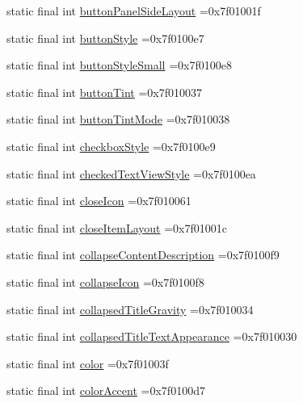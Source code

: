 \begin{DoxyCompactItemize}
\item 
static final int \hyperlink{classcheck_1_1test_1_1_r_1_1attr_a32cad5c610a0ee38f68d1a530b5e5714}{button\+Panel\+Side\+Layout} =0x7f01001f
\item 
static final int \hyperlink{classcheck_1_1test_1_1_r_1_1attr_aeed7bf89db114a56c67e851d7bc203e4}{button\+Style} =0x7f0100e7
\item 
static final int \hyperlink{classcheck_1_1test_1_1_r_1_1attr_ab3ed13cf9d84ee968fa956ca93671a59}{button\+Style\+Small} =0x7f0100e8
\item 
static final int \hyperlink{classcheck_1_1test_1_1_r_1_1attr_ae0edaceba06f9362a37080dd1f7d7822}{button\+Tint} =0x7f010037
\item 
static final int \hyperlink{classcheck_1_1test_1_1_r_1_1attr_ac70c44b347889c97d7002237d7a591d3}{button\+Tint\+Mode} =0x7f010038
\item 
static final int \hyperlink{classcheck_1_1test_1_1_r_1_1attr_ac810a4b97f13c32171e9d45d5921e8a6}{checkbox\+Style} =0x7f0100e9
\item 
static final int \hyperlink{classcheck_1_1test_1_1_r_1_1attr_a7a88a225f47722cfdec2c251480bbaef}{checked\+Text\+View\+Style} =0x7f0100ea
\item 
static final int \hyperlink{classcheck_1_1test_1_1_r_1_1attr_a097e97b7282f3297ba754bfa32c9f891}{close\+Icon} =0x7f010061
\item 
static final int \hyperlink{classcheck_1_1test_1_1_r_1_1attr_ae35720ea07e5591fd2b0f64f7e642fd3}{close\+Item\+Layout} =0x7f01001c
\item 
static final int \hyperlink{classcheck_1_1test_1_1_r_1_1attr_a831929bb7bfa05410b022034fa3b1d23}{collapse\+Content\+Description} =0x7f0100f9
\item 
static final int \hyperlink{classcheck_1_1test_1_1_r_1_1attr_ae765bc74d7af7856f471f981ff65d849}{collapse\+Icon} =0x7f0100f8
\item 
static final int \hyperlink{classcheck_1_1test_1_1_r_1_1attr_a9e98ef24c71f088c89ee2b106577575f}{collapsed\+Title\+Gravity} =0x7f010034
\item 
static final int \hyperlink{classcheck_1_1test_1_1_r_1_1attr_aad84eb784818494ebe3561b1faae4952}{collapsed\+Title\+Text\+Appearance} =0x7f010030
\item 
static final int \hyperlink{classcheck_1_1test_1_1_r_1_1attr_af9989d7fffc42548bab33bf748aff2e2}{color} =0x7f01003f
\item 
static final int \hyperlink{classcheck_1_1test_1_1_r_1_1attr_aa81fc3f823f687d62d265d42b27599e5}{color\+Accent} =0x7f0100d7

\end{DoxyCompactItemize}
